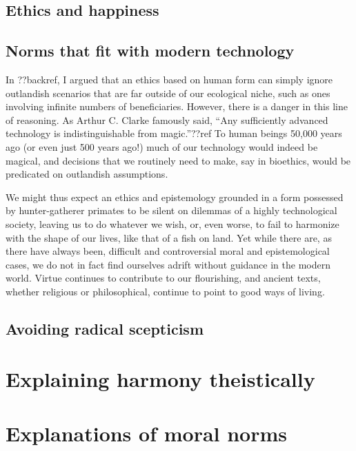 \subsection{Ethics and happiness}

\subsection{Norms that fit with modern technology}
In ??backref, I argued that an ethics based on human form can simply ignore outlandish scenarios
that are far outside of our ecological niche, such as ones involving infinite numbers of
beneficiaries. However, there is a danger in this line of reasoning. As Arthur C. Clarke famously
said, ``Any sufficiently advanced technology is indistinguishable from magic.''??ref To human beings
50,000 years ago (or even just 500 years ago!) much of our technology would indeed be magical, and 
decisions that we routinely need to make, say in bioethics, would be predicated on outlandish assumptions. 

We might thus expect an ethics and epistemology grounded in a form possessed by hunter-gatherer primates
to be silent on dilemmas of a highly technological society, leaving us to do whatever we wish, or, even worse, 
to fail to harmonize with the shape of our lives, like that of a fish on land. Yet while there are, as there 
have always been, difficult and controversial moral and epistemological cases, we do not in fact find 
ourselves adrift without guidance in the modern world. Virtue continues to contribute to our flourishing,
and ancient texts, whether religious or philosophical, continue to point to good ways of living.

\subsection{Avoiding radical scepticism}
\section{Explaining harmony theistically}
\section{Explanations of moral norms}
